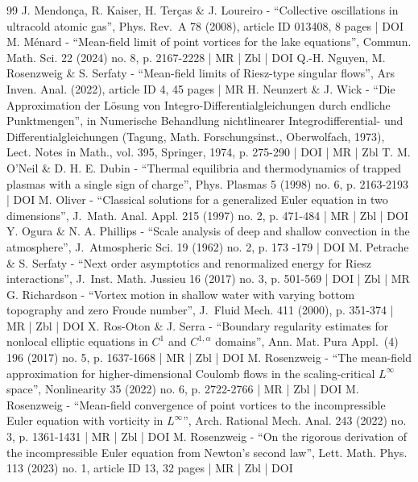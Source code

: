\documentclass[10pt]{amsart}
\theoremstyle{plain}
\theoremstyle{definition}
\begin{document}
\begin{thebibliography}{99}
J. Mendonça, R. Kaiser, H. Terças \& J. Loureiro - “Collective oscillations in ultracold atomic gas”, Phys. Rev. A 78 (2008), article ID 013408, 8 pages | DOI
M. Ménard - “Mean-field limit of point vortices for the lake equations”, Commun. Math. Sci. 22 (2024) no. 8, p. 2167-2228 | MR | Zbl | DOI
Q.-H. Nguyen, M. Rosenzweig \& S. Serfaty - “Mean-field limits of Riesz-type singular flows”, Ars Inven. Anal. (2022), article ID 4, 45 pages | MR
H. Neunzert \& J. Wick - “Die Approximation der Lösung von Integro-Differentialgleichungen durch endliche Punktmengen”, in Numerische Behandlung nichtlinearer Integrodifferential- und Differentialgleichungen (Tagung, Math. Forschungsinst., Oberwolfach, 1973), Lect. Notes in Math., vol. 395, Springer, 1974, p. 275-290 | DOI | MR | Zbl
T. M. O’Neil \& D. H. E. Dubin - “Thermal equilibria and thermodynamics of trapped plasmas with a single sign of charge”, Phys. Plasmas 5 (1998) no. 6, p. 2163-2193 | DOI
M. Oliver - “Classical solutions for a generalized Euler equation in two dimensions”, J. Math. Anal. Appl. 215 (1997) no. 2, p. 471-484 | MR | Zbl | DOI
Y. Ogura \& N. A. Phillips - “Scale analysis of deep and shallow convection in the atmosphere”, J. Atmospheric Sci. 19 (1962) no. 2, p. 173 -179 | DOI
M. Petrache \& S. Serfaty - “Next order asymptotics and renormalized energy for Riesz interactions”, J. Inst. Math. Jussieu 16 (2017) no. 3, p. 501-569 | DOI | Zbl | MR
G. Richardson - “Vortex motion in shallow water with varying bottom topography and zero Froude number”, J. Fluid Mech. 411 (2000), p. 351-374 | MR | Zbl | DOI
X. Ros-Oton \& J. Serra - “Boundary regularity estimates for nonlocal elliptic equations in $C^1$ and $C^{1,\alpha }$ domains”, Ann. Mat. Pura Appl. (4) 196 (2017) no. 5, p. 1637-1668 | MR | Zbl | DOI
M. Rosenzweig - “The mean-field approximation for higher-dimensional Coulomb flows in the scaling-critical $L^\infty $ space”, Nonlinearity 35 (2022) no. 6, p. 2722-2766 | MR | Zbl | DOI
M. Rosenzweig - “Mean-field convergence of point vortices to the incompressible Euler equation with vorticity in $L^\infty $”, Arch. Rational Mech. Anal. 243 (2022) no. 3, p. 1361-1431 | MR | Zbl | DOI
M. Rosenzweig - “On the rigorous derivation of the incompressible Euler equation from Newton’s second law”, Lett. Math. Phys. 113 (2023) no. 1, article ID 13, 32 pages | MR | Zbl | DOI

\end{thebibliography}
\end{document}

